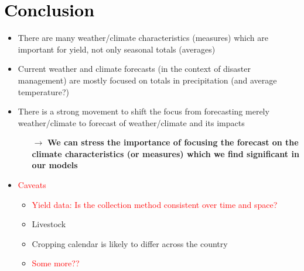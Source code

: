 \documentclass[a4paper,12pt]{article}
\begin{document}
\pagebreak


		
		\color{blue}
\section{\textcolor{black}{Conclusion}}\label{Conclusion}

	\begin{itemize}
	\item There are many weather/climate characteristics (measures) which are important for yield, not only seasonal totals (averages)
	\item  Current weather and climate forecasts (in the context of disaster management) are mostly focused on totals in precipitation (and average temperature?) 
	\item There is a strong movement to shift the focus from forecasting merely weather/climate to forecast of weather/climate and its impacts
	
	\begin{itemize}
	\item[$\boldsymbol{\rightarrow}$] \textbf{We can stress the importance of focusing the forecast on the climate characteristics (or measures) which we find significant in our models}
\end{itemize}

	\item \textcolor{red}{Caveats}
	
	\begin{itemize}
	\item\textcolor{red}{ Yield data: Is the collection method consistent over time and space?}
	\item Livestock
	\item Cropping calendar is likely to differ across the country 
	\item \textcolor{red}{Some more??}
	
	\end{itemize}
\end{itemize}
\color{black}

\FloatBarrier
\pagebreak






\end{document}
